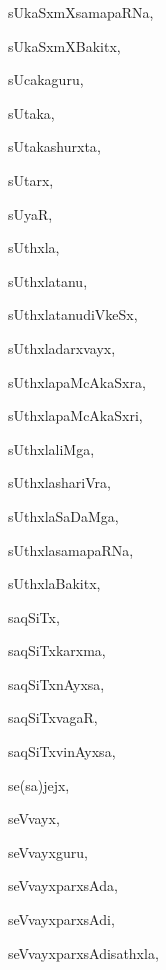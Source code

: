 \begin{multicols}{3}
{\noindent
{sUkaSxmXsamapaRNa}, \pageref{sUkaSxmXsamapaRNa}

\noindent
{sUkaSxmXBakitx}, \pageref{sUkaSxmXBakitx}

\noindent
{sUcakaguru}, \pageref{sUcakaguru}

\noindent
{sUtaka}, \pageref{sUtaka}

\noindent
{sUtakashurxta}, \pageref{sUtakashurxta}

\noindent
{sUtarx}, \pageref{sUtarx}

\noindent
{sUyaR}, \pageref{sUyaR}

\noindent
{sUthxla}, \pageref{sUthxla}

\noindent
{sUthxlatanu}, \pageref{sUthxlatanu}

\noindent
{sUthxlatanudiVkeSx}, \pageref{sUthxlatanudiVkeSx}

\noindent
{sUthxladarxvayx}, \pageref{sUthxladarxvayx}

\noindent
{sUthxlapaMcAkaSxra}, \pageref{sUthxlapaMcAkaSxra}

\noindent
{sUthxlapaMcAkaSxri}, \pageref{sUthxlapaMcAkaSxri}

\noindent
{sUthxlaliMga}, \pageref{sUthxlaliMga}

\noindent
{sUthxlashariVra}, \pageref{sUthxlashariVra}

\noindent
{sUthxlaSaDaMga}, \pageref{sUthxlaSaDaMga}

\noindent
{sUthxlasamapaRNa}, \pageref{sUthxlasamapaRNa}

\noindent
{sUthxlaBakitx}, \pageref{sUthxlaBakitx}

\noindent
{saqSiTx}, \pageref{saqSiTx}

\noindent
{saqSiTxkarxma}, \pageref{saqSiTxkarxma}

\noindent
{saqSiTxnAyxsa}, \pageref{saqSiTxnAyxsa}

\noindent
{saqSiTxvagaR}, \pageref{saqSiTxvagaR}

\noindent
{saqSiTxvinAyxsa}, \pageref{saqSiTxvinAyxsa}

\noindent
{se(sa)jejx}, \pageref{sesajejx}

\noindent
{seVvayx}, \pageref{seVvayx}

\noindent
{seVvayxguru}, \pageref{seVvayxguru}

\noindent
{seVvayxparxsAda}, \pageref{seVvayxparxsAda}

\noindent
{seVvayxparxsAdi}, \pageref{seVvayxparxsAdi}

\noindent
{seVvayxparxsAdisathxla}, \pageref{seVvayxparxsAdisathxla}

}
\end{multicols}
